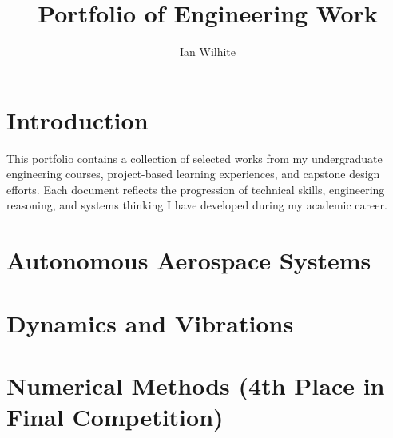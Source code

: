 \documentclass[a4paper,12pt]{article}
\title{Portfolio of Engineering Work}
\author{Ian Wilhite}
\begin{document}

\section*{Introduction}
This portfolio contains a collection of selected works from my undergraduate engineering courses, project-based learning experiences, and capstone design efforts. Each document reflects the progression of technical skills, engineering reasoning, and systems thinking I have developed during my academic career.


\tableofcontents
\newpage


\section{Autonomous Aerospace Systems}








\section{Dynamics and Vibrations}




\section{Numerical Methods (4th Place in Final Competition)}




\end{document}

